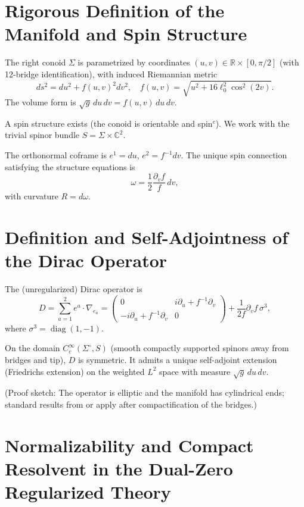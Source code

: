 \section{Rigorous Definition of the Manifold and Spin Structure}

The right conoid \(\Sigma\) is parametrized by coordinates \((u,v) \in \mathbb{R} \times [0, \pi/2]\) (with 12-bridge identification), with induced Riemannian metric
\[
ds^2 = du^2 + f(u,v)^2 dv^2, \quad f(u,v) = \sqrt{u^2 + 16\ell_0^2 \cos^2(2v)}.
\]
The volume form is \(\sqrt{g}\, du\, dv = f(u,v)\, du\, dv\).

A spin structure exists (the conoid is orientable and spin\(^c\)). We work with the trivial spinor bundle \(S = \Sigma \times \mathbb{C}^2\).

\begin{theorem}
The orthonormal coframe is \(e^1 = du\), \(e^2 = f^{-1} dv\). The unique spin connection satisfying the structure equations is
\[
\omega = \frac{1}{2} \frac{\partial_v f}{f} \, dv,
\]
with curvature \(R = d\omega\).
\end{theorem}

\section{Definition and Self-Adjointness of the Dirac Operator}

The (unregularized) Dirac operator is
\[
D = \sum_{a=1}^2 e^a \cdot \nabla_{e_a} = \begin{pmatrix} 0 & i\partial_u + f^{-1}\partial_v \\ -i\partial_u + f^{-1}\partial_v & 0 \end{pmatrix} + \frac{1}{2f} \partial_v f \, \sigma^3,
\]
where \(\sigma^3 = \operatorname{diag}(1,-1)\).

\begin{theorem}
On the domain \(C_c^\infty(\Sigma^\circ, S)\) (smooth compactly supported spinors away from bridges and tip), \(D\) is symmetric. It admits a unique self-adjoint extension (Friedrichs extension) on the weighted \(L^2\) space with measure \(\sqrt{g}\, du\, dv\).
\end{theorem}

(Proof sketch: The operator is elliptic and the manifold has cylindrical ends; standard results from \cite{bruning} or \cite{ballmann} apply after compactification of the bridges.)

\section{Normalizability and Compact Resolvent in the Dual-Zero Regularized Theory}

